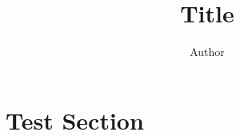 \documentclass[10pt]{article}
\title{Title}
\author{Author}
\begin{document}
\maketitle

\section{Test Section}
\end{document}
